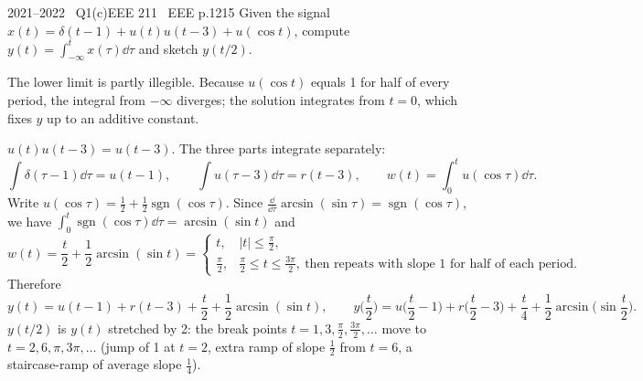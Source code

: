 \begin{qcard}{2021--2022 \textbullet\ Q1(c)}{EEE 211 \textbullet\ EEE p.12}{15}
Given the signal $x(t)=\delta(t-1)+u(t)u(t-3)+u(\cos t)$, compute $y(t)=\int_{-\infty}^{t}x(\tau)\dd\tau$ and sketch $y(t/2)$.
\end{qcard}
\begin{notebox}The lower limit is partly illegible. Because $u(\cos t)$ equals 1 for half of every period, the integral from $-\infty$ diverges; the solution integrates from $t=0$, which fixes $y$ up to an additive constant.\end{notebox}
\begin{solution}
$u(t)u(t-3)=u(t-3)$. The three parts integrate separately:
\[
\int\delta(\tau-1)\dd\tau=u(t-1),\qquad \int u(\tau-3)\dd\tau=r(t-3),\qquad
w(t)=\int_0^t u(\cos\tau)\dd\tau .
\]
Write $u(\cos\tau)=\tfrac12+\tfrac12\operatorname{sgn}(\cos\tau)$. Since $\frac{\dd}{\dd\tau}\arcsin(\sin\tau)=\operatorname{sgn}(\cos\tau)$, we have $\int_0^t\operatorname{sgn}(\cos\tau)\dd\tau=\arcsin(\sin t)$ and
\[
w(t)=\frac t2+\frac12\arcsin(\sin t)=\begin{cases}t,&|t|\le\frac\pi2,\\ \frac\pi2,&\frac\pi2\le t\le\frac{3\pi}2,\ \text{then repeats with slope }1\text{ for half of each period.}\end{cases}
\]
Therefore
\[
y(t)=u(t-1)+r(t-3)+\frac t2+\frac12\arcsin(\sin t),\qquad
y\!\Big(\frac t2\Big)=u\!\Big(\frac t2-1\Big)+r\!\Big(\frac t2-3\Big)+\frac t4+\frac12\arcsin\!\Big(\sin\frac t2\Big).
\]
$y(t/2)$ is $y(t)$ stretched by 2: the break points $t=1,3,\frac\pi2,\frac{3\pi}2,\dots$ move to $t=2,6,\pi,3\pi,\dots$ (jump of 1 at $t=2$, extra ramp of slope $\frac12$ from $t=6$, a staircase-ramp of average slope $\frac14$).
\begin{center}
\end{center}
\end{solution}

